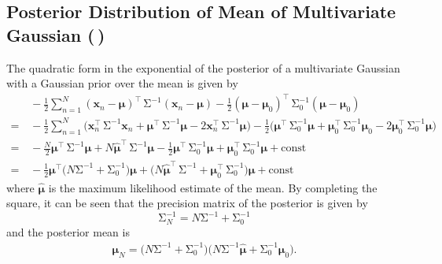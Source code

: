 \documentclass[11pt, a4paper]{scrartcl}
\newcommand{\transposed}{{\!\top\!}}
\renewcommand{\vec}[1]{\bm{#1}}
\newcommand{\mat}[1]{\bm{\mathrm{#1}}}
\newcommand{\diffstar}{\texorpdfstring{\raisebox{-1pt}{\resizebox{!}{8pt}{\(\star\)}}}{*}}
\newcommand{\twostar}  {(\diffstar\,\diffstar)}
\begin{document}

		\subsection{Posterior Distribution of Mean of Multivariate Gaussian  \twostar}
			The quadratic form in the exponential of the posterior of a multivariate Gaussian with a Gaussian prior over the mean is given by
			\begin{align}
				 &\, -\frac{1}{2} \sum_{n = 1}^{N} (\vec{x}_n - \vec{\mu})^\transposed\, \mat{\Sigma}^{-1} (\vec{x}_n - \vec{\mu}) - \frac{1}{2} (\vec{\mu} - \vec{\mu}_0)^\transposed\, \mat{\Sigma}_0^{-1} (\vec{\mu} - \vec{\mu}_0) \\
				=&\, -\frac{1}{2} \sum_{n = 1}^{N} \big( \vec{x}_n^\transposed\, \mat{\Sigma}^{-1} \vec{x}_n + \vec{\mu}^\transposed\, \mat{\Sigma}^{-1} \vec{\mu} - 2 \vec{x}_n^\transposed\, \mat{\Sigma}^{-1} \vec{\mu} \big) - \frac{1}{2} \big( \vec{\mu}^\transposed\, \mat{\Sigma}_0^{-1} \vec{\mu} + \vec{\mu}_0^\transposed\, \mat{\Sigma}_0^{-1} \vec{\mu}_0 - 2 \vec{\mu}_0^\transposed\, \mat{\Sigma}_0^{-1} \vec{\mu} \big) \\
				=&\, -\frac{N}{2} \vec{\mu}^\transposed\, \mat{\Sigma}^{-1} \vec{\mu} + N \hat{\vec{\mu}}^\transposed\, \mat{\Sigma}^{-1} \vec{\mu} - \frac{1}{2} \vec{\mu}^\transposed\, \mat{\Sigma}_0^{-1} \vec{\mu} + \vec{\mu}_0^\transposed\, \mat{\Sigma}_0^{-1} \vec{\mu} + \mathrm{const} \\
				=&\, -\frac{1}{2} \vec{\mu}^\transposed \big( N \mat{\Sigma}^{-1} + \mat{\Sigma}_0^{-1} \big) \vec{\mu} + \big( N \hat{\vec{\mu}}^\transposed\, \mat{\Sigma}^{-1} + \vec{\mu}_0^\transposed\, \mat{\Sigma}_0^{-1} \big) \vec{\mu} + \mathrm{const}
			\end{align}
			where \( \hat{\vec{\mu}} \) is the maximum likelihood estimate of the mean. By completing the square, it can be seen that the precision matrix of the posterior is given by
			\begin{equation}
				\mat{\Sigma}_N^{-1}
					= N \mat{\Sigma}^{-1} + \mat{\Sigma}_0^{-1}
			\end{equation}
			and the posterior mean is
			\begin{align}
				\vec{\mu}_N = \big( N \mat{\Sigma}^{-1} + \mat{\Sigma}_0^{-1} \big) \big( N \mat{\Sigma}^{-1} \hat{\vec{\mu}} + \mat{\Sigma}_0^{-1} \vec{\mu}_0  \big).
			\end{align}
\end{document}
